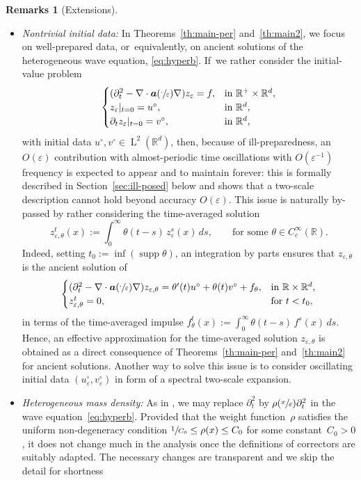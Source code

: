 \documentclass[10pt]{amsart}
\theoremstyle{plain}
\theoremstyle{definition}
\newtheorem{rems0}[theor0]{Remarks}
\newenvironment{rems}
{\renewcommand{\qedsymbol}{$\lozenge$}\pushQED{\qed}\begin{rems0}}
{\popQED\end{rems0}}
\numberwithin{equation}{section}
\newcommand{\e}{\varepsilon}
\newcommand{\R}{\mathbb R}
\newcommand{\Aa}{\boldsymbol a}
\newcommand{\Ld}{\operatorname{L}}
\newcommand{\supp}{\operatorname{supp}}
\begin{document}
\skpt
\begin{rems}[Extensions]\label{rem:ill-prepared}
\begin{itemize}
\item {\it Nontrivial initial data:}
In Theorems~\ref{th:main-per} and~\ref{th:main2}, we focus on well-prepared data, or~equivalently, on ancient solutions of the heterogeneous wave equation, \cf \eqref{eq:hyperb}.
If~we rather consider the initial-value problem
\begin{equation*}
\begin{cases}
(\partial_t^2-\nabla\cdot\Aa(\sfrac\cdot\e)\nabla)z_\e=f,&\text{in $\R^+\times\R^d$},\\
z_\e|_{t=0}=u^\circ,&\text{in $\R^d$},\\
\partial_tz_\e|_{t=0}=v^\circ,&\text{in $\R^d$},
\end{cases}
\end{equation*}
with initial data $u^\circ,v^\circ\in\Ld^2(\R^d)$,
then, because of ill-preparedness, an $O(\e)$ contribution with almost-periodic time oscillations with $O(\e^{-1})$ frequency is expected to appear and to maintain forever: this is formally described in Section~\ref{sec:ill-posed} below and shows that a two-scale description cannot hold beyond accuracy $O(\e)$.
This issue is naturally by-passed by rather considering the time-averaged solution
\[z_{\e,\theta}^t(x):=\int_0^\infty\theta(t-s)\,z_\e^s(x)\,ds,\qquad\text{for some $\theta\in C^\infty_c(\R)$.}\]
Indeed, setting $t_0:=\inf(\supp\theta)$, an integration by parts ensures that $z_{\e,\theta}$ is the ancient solution of
\begin{gather}\label{eq:time-average-form}
\begin{cases}
(\partial_t^2-\nabla\cdot\Aa(\sfrac\cdot\e)\nabla)z_{\e,\theta}=\theta'(t)u^\circ+\theta(t) v^\circ+f_\theta,&\text{in $\R\times\R^d$},\\
z_{\e,\theta}^t=0,&\text{for $t<t_0$},
\end{cases}
\end{gather}
{in terms of the time-averaged impulse $f_\theta^t(x):=\int_0^\infty\theta(t-s)\,f^s(x)\,ds$.}
Hence, an effective approximation for the time-averaged solution $z_{\e,\theta}$ is obtained as a direct consequence of Theorems~\ref{th:main-per} and~\ref{th:main2} for ancient solutions.
{Another way to solve this issue is to consider oscillating initial data $(u^\circ_\e,v^\circ_\e)$ in form
of a spectral two-scale expansion.}

\item {\it Heterogeneous mass density:}
As in \cite{ALR}, we may replace $\partial_t^2$ by $\rho(\sfrac x\e)\partial_t^2$ in the wave equation~\eqref{eq:hyperb}. Provided that the weight function~$\rho$ satisfies the uniform non-degeneracy condition $\sfrac1{C_0}\le\rho(x)\le C_0$ for some constant~$C_0>0$, it does not change much in the analysis once the definitions of correctors are suitably adapted. The necessary changes are transparent and we skip the detail for shortness\qedhere
\end{itemize}
\end{rems}
\end{document}
